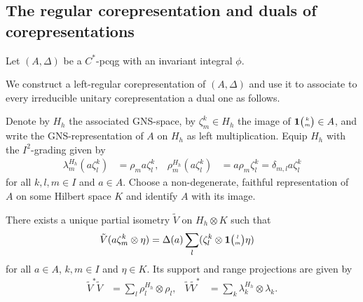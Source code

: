 \subsection{The regular  corepresentation and duals of corepresentations}
\label{subsection:reg-corep}
Let $(A,\Delta)$ be a $C^{*}$-pcqg with an invariant integral $\phi$.

We  construct a left-regular corepresentation of $(A,\Delta)$ and
use it to associate to every irreducible unitary corepresentation a
dual one as follows.

 
 Denote by $H_{h}$ the associated GNS-space, by $\zeta^k_m \in H_{h}$ the image of $\mathbf{1}{\tiny {\begin{pmatrix} k\\m\end{pmatrix}}}
 \in A$, and write the GNS-representation of $A$ on $H_{h}$ as left multiplication.   Equip
 $H_{h}$ with the $I^{2}$-grading given by
 \begin{align*}
   \lambda^{H_{h}}_{m}  (a\zeta^{k}_{l}) &=  \rho_{m}a \zeta^{k}_{l}, &
   \rho^{H_{h}}_{m} (a\zeta^{k}_{l}) &= a\rho_{m} \zeta^{k}_{l} = \delta_{m,l} a\zeta^{k}_{l}
 \end{align*}
 for all $k,l,m\in I$ and $a\in A$.
 Choose a non-degenerate, faithful representation of $A$ on some Hilbert space $K$ and identify $A$
 with its image.
 \begin{Lem}\label{lem:reg-corep-pi}
   There exists a unique partial isometry $\tilde V$ on $H_{h} \otimes
   K$ such
   that
   \begin{align} \label{eq:regular-corep-pi}
     \tilde V(a \zeta^k_m \otimes \eta) &=
     \Delta(a) \sum_{l}(\zeta^{k}_{l} \otimes \mathbf{1}{\tiny {\begin{pmatrix} l\\m\end{pmatrix}}}\eta)
   \end{align}
   for all $a\in A$, $k,m\in I$ and $\eta\in K$. Its support and range
   projections are given by
   \begin{align*}
     \tilde V^{*}\tilde V &= \sum_{l} \rho^{H_{h}}_{l} \otimes \rho_{l}, &
     \tilde V \tilde V^{*} &= \sum_{k} \lambda^{H_{h}}_{k} \otimes \lambda_{k}.
   \end{align*}
 \end{Lem}
